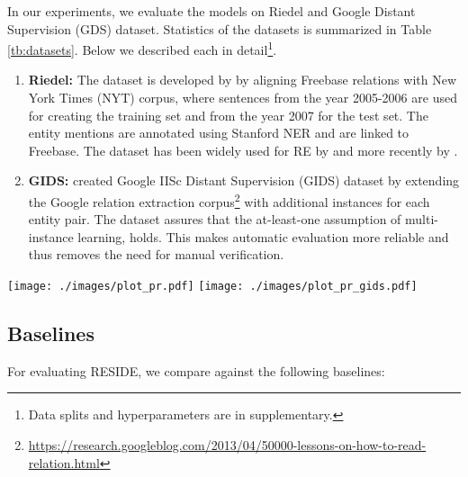 \documentclass[11pt,a4paper]{article}
\newcommand{\reftbl}[1]{Table \ref{#1}}
\newcommand{\refsec}[1]{Section \ref{#1}}
\newcommand{\method}{RESIDE}
\begin{document}
In our experiments, we evaluate the models on Riedel and Google Distant Supervision (GDS) dataset. Statistics of the datasets is summarized in \reftbl{tb:datasets}. Below we described each in detail\footnote{Data splits and hyperparameters are in supplementary.}.
\begin{enumerate}[leftmargin=*]
	\item \textbf{Riedel:} The dataset is developed by \cite{riedel2010modeling} by aligning Freebase relations with New York Times (NYT) corpus, where sentences from the year 2005-2006 are used for creating the training set and from the year 2007 for the test set. The entity mentions are annotated using Stanford NER \cite{finkel2005incorporating} and are linked to Freebase. The dataset has been widely used for RE by \cite{hoffmann2011knowledge,surdeanu2012multi} and more recently by \cite{lin2016neural,feng2017effective,see_paper}. 

	\item \textbf{GIDS:} \citet{bgwa_paper} created Google IISc Distant Supervision (GIDS) dataset by extending the Google relation extraction corpus\footnote{\href{https://research.googleblog.com/2013/04/50000-lessons-on-how-to-read-relation.html}{https://research.googleblog.com/2013/04/50000-lessons-on-how-to-read-relation.html}} with additional instances for each entity pair. The dataset assures that the at-least-one assumption of multi-instance learning, holds. This makes automatic evaluation more reliable and thus removes the need for manual verification.
\end{enumerate}



\begin{figure*}[t]
	\begin{minipage}{\textwidth}
		\captionsetup{type=figure} \centering
		{\texttt{[image: ./images/plot\_pr.pdf]}}
		{\texttt{[image: ./images/plot\_pr\_gids.pdf]}}
		\caption[main]{\label{fig:main_pr}Comparison of Precision-recall curve. \method{} achieves higher precision over the entire range of recall than all the baselines on both datasets. Please refer \refsec{sec:results_main} for more details.}
	\end{minipage}
\end{figure*}


\subsection{Baselines}
\label{sec:baselines}
For evaluating \method{}, we compare against the following baselines:
\end{document}
